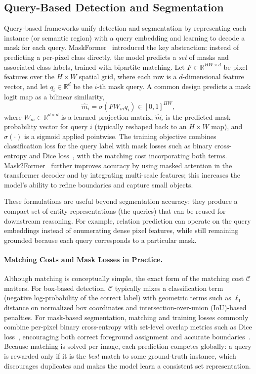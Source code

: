\subsection{Query-Based Detection and Segmentation}
Query-based frameworks unify detection and segmentation by representing each instance (or semantic region) with a query embedding and learning to decode a mask for each query. MaskFormer~\citep{cheng2021per} introduced the key abstraction: instead of predicting a per-pixel class directly, the model predicts a \emph{set} of masks and associated class labels, trained with bipartite matching. Let $F\in\mathbb{R}^{HW\times d}$ be pixel features over the $H\times W$ spatial grid, where each row is a $d$-dimensional feature vector, and let $q_i\in\mathbb{R}^{d}$ be the $i$-th mask query. A common design predicts a mask logit map as a bilinear similarity,
\begin{equation}
\hat m_i = \sigma\!\left(F W_m q_i\right)\in[0,1]^{HW},
\end{equation}
where $W_m\in\mathbb{R}^{d\times d}$ is a learned projection matrix, $\hat m_i$ is the predicted mask probability vector for query $i$ (typically reshaped back to an $H\times W$ map), and $\sigma(\cdot)$ is a sigmoid applied pointwise. The training objective combines classification loss for the query label with mask losses such as binary cross-entropy and Dice loss~\citep{sudre2017generalised}, with the matching cost incorporating both terms. Mask2Former~\citep{cheng2022masked} further improves accuracy by using masked attention in the transformer decoder and by integrating multi-scale features; this increases the model's ability to refine boundaries and capture small objects.

These formulations are useful beyond segmentation accuracy: they produce a compact set of entity representations (the queries) that can be reused for downstream reasoning. For example, relation prediction can operate on the query embeddings instead of enumerating dense pixel features, while still remaining grounded because each query corresponds to a particular mask.

\paragraph{Matching Costs and Mask Losses in Practice.}
Although matching is conceptually simple, the exact form of the matching cost $\mathcal{C}$ matters. For box-based detection, $\mathcal{C}$ typically mixes a classification term (negative log-probability of the correct label) with geometric terms such as $\ell_1$ distance on normalized box coordinates and intersection-over-union (IoU)-based penalties. For mask-based segmentation, matching and training losses commonly combine per-pixel binary cross-entropy with set-level overlap metrics such as Dice loss~\citep{sudre2017generalised}, encouraging both correct foreground assignment and accurate boundaries~\citep{cheng2021per, cheng2022masked}. Because matching is solved per image, each prediction competes globally: a query is rewarded only if it is the \emph{best} match to some ground-truth instance, which discourages duplicates and makes the model learn a consistent set representation.

